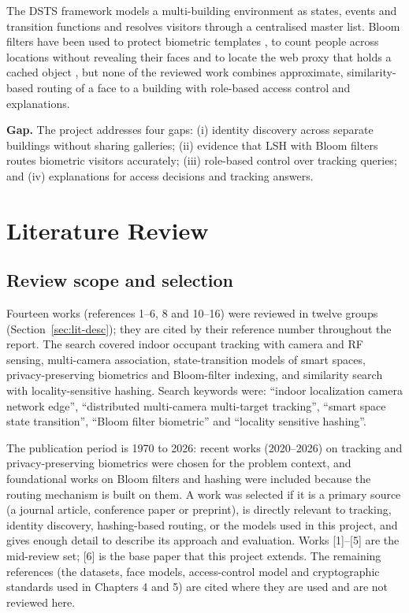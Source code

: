 \documentclass[12pt,a4paper,oneside]{report}
\begin{document}
The DSTS framework \cite{ref6} models a multi-building environment as states, events and transition functions and resolves visitors through a centralised master list. Bloom filters have been used to protect biometric templates \cite{ref10}, to count people across locations without revealing their faces \cite{ref11} and to locate the web proxy that holds a cached object \cite{ref13}, but none of the reviewed work combines approximate, similarity-based routing of a face to a building with role-based access control and explanations.



\textbf{Gap.} The project addresses four gaps: (i) identity discovery across separate buildings without sharing galleries; (ii) evidence that LSH with Bloom filters routes biometric visitors accurately; (iii) role-based control over tracking queries; and (iv) explanations for access decisions and tracking answers.

\clearpage
\chapter{Literature Review}
\section{Review scope and selection}
Fourteen works (references 1--6, 8 and 10--16) were reviewed in twelve groups (Section~\ref{sec:lit-desc}); they are cited by their reference number throughout the report. The search covered indoor occupant tracking with camera and RF sensing, multi-camera association, state-transition models of smart spaces, privacy-preserving biometrics and Bloom-filter indexing, and similarity search with locality-sensitive hashing. Search keywords were: ``indoor localization camera network edge'', ``distributed multi-camera multi-target tracking'', ``smart space state transition'', ``Bloom filter biometric'' and ``locality sensitive hashing''.

The publication period is 1970 to 2026: recent works (2020--2026) on tracking and privacy-preserving biometrics were chosen for the problem context, and foundational works on Bloom filters and hashing were included because the routing mechanism is built on them. A work was selected if it is a primary source (a journal article, conference paper or preprint), is directly relevant to tracking, identity discovery, hashing-based routing, or the models used in this project, and gives enough detail to describe its approach and evaluation. Works [1]--[5] are the mid-review set; [6] is the base paper that this project extends. The remaining references (the datasets, face models, access-control model and cryptographic standards used in Chapters 4 and 5) are cited where they are used and are not reviewed here.
\end{document}
